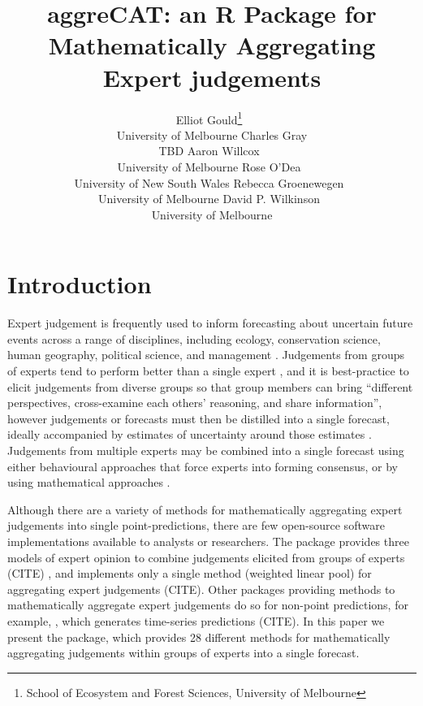 \documentclass[article]{jss}
\author{Elliot
Gould\footnote{School of Ecosystem and Forest Sciences, University of
  Melbourne}~\orcidlink{0000-0002-6585-538X}\\University of
Melbourne \And Charles Gray\\TBD \AND Aaron
Willcox~\orcidlink{https://orcid.org/0000-0003-2536-2596}\\University of
Melbourne \And Rose O'Dea~\orcidlink{0000-0001-8177-5075}\\University of
New South Wales \AND Rebecca
Groenewegen~\orcidlink{https://orcid.org/0000-0001-9177-8536}\\University
of Melbourne \And David P.
Wilkinson~\orcidlink{0000-0002-9560-6499}\\University of Melbourne}
\title{aggreCAT: an R Package for Mathematically Aggregating Expert
judgements}
\begin{document}
\maketitle
\ifdefined\Shaded\renewenvironment{Shaded}{\begin{tcolorbox}[interior hidden, sharp corners, breakable, frame hidden, borderline west={3pt}{0pt}{shadecolor}, enhanced, boxrule=0pt]}{\end{tcolorbox}}\fi

\hypertarget{sec-introduction}{%
\section{Introduction}\label{sec-introduction}}

Expert judgement is frequently used to inform forecasting about
uncertain future events across a range of disciplines, including
ecology, conservation science, human geography, political science, and
management \citep{Sutherland2018}. Judgements from groups of experts
tend to perform better than a single expert \citep{Goossens2008}, and it
is best-practice to elicit judgements from diverse groups so that group
members can bring ``different perspectives, cross-examine each others'
reasoning, and share information'', however judgements or forecasts must
then be distilled into a single forecast, ideally accompanied by
estimates of uncertainty around those estimates \citep{Hanea2021}.
Judgements from multiple experts may be combined into a single forecast
using either behavioural approaches that force experts into forming
consensus, or by using mathematical approaches \citep{Goossens2008}.

Although there are a variety of methods for mathematically aggregating
expert judgements into single point-predictions, there are few
open-source software implementations available to analysts or
researchers. The  \citet{R} package provides
three models of expert opinion to combine judgements elicited from
groups of experts (CITE) , and  implements only a single
method (weighted linear pool) for aggregating expert judgements (CITE).
Other  packages providing methods to mathematically
aggregate expert judgements do so for non-point predictions, for
example, , which generates time-series predictions (CITE). In
this paper we present the  package, which provides 28
different methods for mathematically aggregating judgements within
groups of experts into a single forecast.
\end{document}
